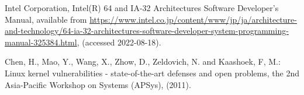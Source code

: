 \documentclass[paper]{ieice}
\begin{document}
\begin{thebibliography}{99}
  Intel Corporation, Intel(R) 64 and IA-32 Architectures Software Developer’s Manual,
  available from \url{https://www.intel.co.jp/content/www/jp/ja/architecture-and-technology/64-ia-32-architectures-software-developer-system-programming-manual-325384.html}, (accessed 2022-08-18).


  Chen, H., Mao, Y., Wang, X., Zhow, D., Zeldovich, N. and Kaashoek, F, M.: Linux kernel vulnerabilities - state-of-the-art defenses and open problems, the 2nd Asia-Pacific Workshop on Systems (APSys), (2011).




\end{thebibliography}
\end{document}
